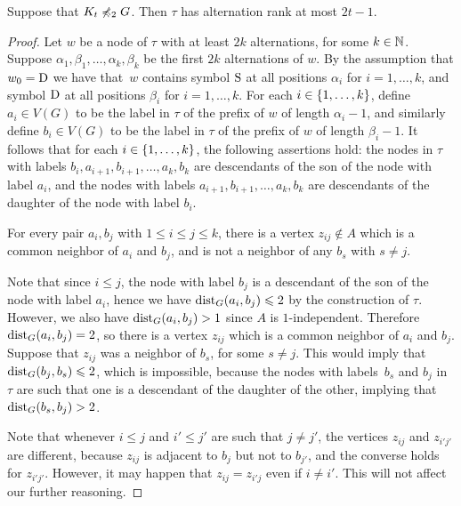 \begin{lemma}\label{thm:alternation-rank-type-tree}
Suppose that  $K_t\not\preccurlyeq_{2} G$.
Then $\tau$ has alternation rank at most $2t-1$.
\end{lemma}
\begin{proof}
	Let $w$ be a node of $\tau$ with at least $2k$ alternations, for some $k\in \mathbb{N}$.
	Suppose $\alpha_1,\beta_1,\ldots,\alpha_k,\beta_k$ be the first $2k$ alternations of $w$.
	By the assumption that $w_0=\mathrm{D}$ we have that~$w$ contains symbol $\mathrm{S}$ at all positions $\alpha_i$ for $i=1,\ldots,k$, and symbol $\mathrm{D}$ at all positions $\beta_i$ for $i=1,\ldots,k$.
	For each $i\in \{1,\ldots,k\}$, define $a_i\in V(G)$ to be the label in $\tau$ of the prefix of $w$ of length $\alpha_i-1$, and similarly define $b_i\in V(G)$ to be the label in $\tau$ of the prefix of $w$
	of length $\beta_i-1$. 
	It follows that for each $i\in \{1,\ldots,k\}$, the following assertions hold:
	the nodes in $\tau$ with labels $b_i,a_{i+1},b_{i+1},\ldots,a_k,b_k$ are  descendants of the son of the node with label $a_i$,
	and the nodes with labels $a_{i+1},b_{i+1},\ldots,a_k,b_k$
	are descendants of the daughter of the node with label $b_i$.
	
	\begin{claim}\label{claim:minor}
		For every pair $a_i,b_j$ with $1\le i\le j\le k$, there is a vertex $z_{ij}\not\in A$	 which is a common neighbor of $a_i$ and $b_j$,
		and is not a neighbor of any $b_s$ with $s\neq j$.
	\end{claim}
	\begin{clproof}
		Note that since $i\le j$, the node with label $b_j$ is a descendant of the son of the node with label $a_i$, hence we have $\mathrm{dist}_G(a_i,b_j)\leqslant 2$ by the construction of $\tau$.
		However, we also have $\mathrm{dist}_G(a_i,b_j)>1$ since $A$
		is $1$-independent. Therefore $\mathrm{dist}_G(a_i,b_j)=2$, so there is a vertex $z_{ij}$ which is a common neighbor of $a_i$ and $b_j$. 
		Suppose that $z_{ij}$ was a neighbor of $b_s$, for some $s\neq j$. This would imply that $\mathrm{dist}_G(b_j,b_s)\leqslant 2$, which is impossible, 
because
		 the nodes with labels~$b_s$ and $b_j$ in $\tau$ are such that one is a descendant of the daughter of the other, implying that $\mathrm{dist}_G(b_s,b_j)>2$.
	\end{clproof}
  
Note that whenever $i\leq j$ and $i'\leq j'$ are such that $j\neq j'$, the vertices $z_{ij}$ and $z_{i'j'}$ are different, because $z_{ij}$ is adjacent to $b_{j}$ but not to $b_{j'}$, and the converse holds for $z_{i'j'}$.
However, it may happen that $z_{ij}=z_{i'j}$ even if $i\neq i'$. This will not affect our further reasoning.


\end{proof}
